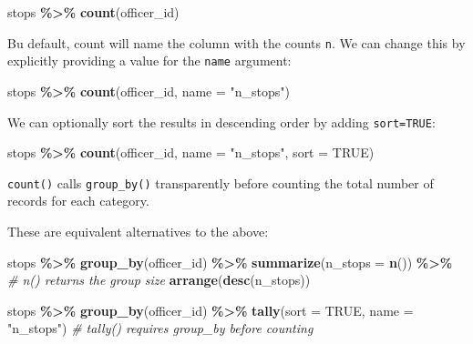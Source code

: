 \documentclass[
]{book}
\newenvironment{Shaded}{\begin{snugshade}}{\end{snugshade}}
\newcommand{\AttributeTok}[1]{\textcolor[rgb]{0.13,0.29,0.53}{#1}}
\newcommand{\CommentTok}[1]{\textcolor[rgb]{0.56,0.35,0.01}{\textit{#1}}}
\newcommand{\ConstantTok}[1]{\textcolor[rgb]{0.56,0.35,0.01}{#1}}
\newcommand{\FunctionTok}[1]{\textcolor[rgb]{0.13,0.29,0.53}{\textbf{#1}}}
\newcommand{\NormalTok}[1]{#1}
\newcommand{\SpecialCharTok}[1]{\textcolor[rgb]{0.81,0.36,0.00}{\textbf{#1}}}
\newcommand{\StringTok}[1]{\textcolor[rgb]{0.31,0.60,0.02}{#1}}
\begin{document}
\begin{Shaded}
\begin{Highlighting}[]
\NormalTok{stops }\SpecialCharTok{\%\textgreater{}\%}
  \FunctionTok{count}\NormalTok{(officer\_id)}
\end{Highlighting}
\end{Shaded}

Bu default, count will name the column with the counts \texttt{n}. We can change this by explicitly providing a value for the \texttt{name} argument:

\begin{Shaded}
\begin{Highlighting}[]
\NormalTok{stops }\SpecialCharTok{\%\textgreater{}\%}
  \FunctionTok{count}\NormalTok{(officer\_id, }\AttributeTok{name =} \StringTok{"n\_stops"}\NormalTok{)}
\end{Highlighting}
\end{Shaded}

We can optionally sort the results in descending order by adding \texttt{sort=TRUE}:

\begin{Shaded}
\begin{Highlighting}[]
\NormalTok{stops }\SpecialCharTok{\%\textgreater{}\%}
  \FunctionTok{count}\NormalTok{(officer\_id, }\AttributeTok{name =} \StringTok{"n\_stops"}\NormalTok{, }\AttributeTok{sort =} \ConstantTok{TRUE}\NormalTok{)}
\end{Highlighting}
\end{Shaded}

\texttt{count()} calls \texttt{group\_by()} transparently before counting the total number of records for each category.

These are equivalent alternatives to the above:

\begin{Shaded}
\begin{Highlighting}[]
\NormalTok{stops }\SpecialCharTok{\%\textgreater{}\%}
  \FunctionTok{group\_by}\NormalTok{(officer\_id) }\SpecialCharTok{\%\textgreater{}\%}
  \FunctionTok{summarize}\NormalTok{(}\AttributeTok{n\_stops =} \FunctionTok{n}\NormalTok{()) }\SpecialCharTok{\%\textgreater{}\%} \CommentTok{\# n() returns the group size}
  \FunctionTok{arrange}\NormalTok{(}\FunctionTok{desc}\NormalTok{(n\_stops))}

\NormalTok{stops }\SpecialCharTok{\%\textgreater{}\%}
  \FunctionTok{group\_by}\NormalTok{(officer\_id) }\SpecialCharTok{\%\textgreater{}\%} 
  \FunctionTok{tally}\NormalTok{(}\AttributeTok{sort =} \ConstantTok{TRUE}\NormalTok{, }\AttributeTok{name =} \StringTok{"n\_stops"}\NormalTok{) }\CommentTok{\# tally() requires group\_by before counting}
\end{Highlighting}
\end{Shaded}
\end{document}
